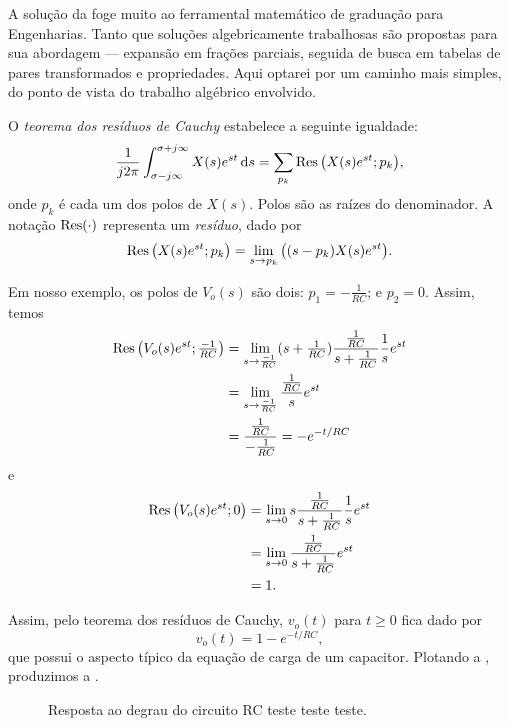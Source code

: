 A solução da  foge muito ao ferramental matemático de graduação para Engenharias. Tanto que soluções algebricamente trabalhosas são propostas para sua abordagem --- expansão em frações parciais, seguida de busca em tabelas de pares transformados e propriedades. Aqui optarei por um caminho mais simples, do ponto de vista do trabalho algébrico envolvido.

O \emph{teorema dos resíduos de Cauchy} estabelece a seguinte igualdade:
\begin{equation}\label{eq:cauchy}
	\frac{1}{j2\pi}\inte{X(s)e^{st}}{s}{\sigma-j\infty}{\sigma+j\infty}=\sum_{p_k}\res\big(X(s)e^{st};p_k\big),
\end{equation}
onde $p_k$ é cada um dos polos de $X(s)$. Polos são as raízes do denominador. A notação $\res(\cdot)$ representa um \emph{resíduo}, dado por
\begin{equation}\label{eq:res}
	\res\big(X(s)e^{st};p_k\big)=\lim_{s\to p_k}\big((s-p_k)X(s)e^{st}\big).
\end{equation}

Em nosso exemplo, os polos de $V_o(s)$ são dois: $p_1=-\frac{1}{RC}$; e $p_2=0$. Assim, temos
\begin{align*}
	\res\big(V_o(s)e^{st};{\textstyle\frac{-1}{RC}}\big)&=\lim_{s\to\frac{-1}{RC}}({\textstyle s+\frac{1}{RC}})\frac{\frac{1}{RC}}{s+\frac{1}{RC}}\frac{1}{s}e^{st}\\
	&=\lim_{s\to\frac{-1}{RC}}\frac{\frac{1}{RC}}{s}e^{st}\\
	&=\frac{\frac{1}{RC}}{-\frac{1}{RC}}=-e^{-t\slash RC}
\end{align*}
e
\begin{align*}
	\res\big(V_o(s)e^{st};0\big)&=\lim_{s\to0}s\frac{\frac{1}{RC}}{s+\frac{1}{RC}}\frac{1}{s}e^{st}\\
	&=\lim_{s\to0}\frac{\frac{1}{RC}}{s+\frac{1}{RC}}e^{st}\\
	&=1.
\end{align*}

Assim, pelo teorema dos resíduos de Cauchy, $v_o(t)$ para $t\geq0$ fica dado por
\begin{equation}\label{eq:cc}
	v_o(t)=1-e^{-t/RC},
\end{equation}
que possui o aspecto típico da equação de carga de um capacitor. Plotando a , produzimos a .

\begin{figure}[ht]
	\centering
	\caption{Resposta ao degrau do circuito RC teste teste teste.}
	\label{fig:cc}
\end{figure}

